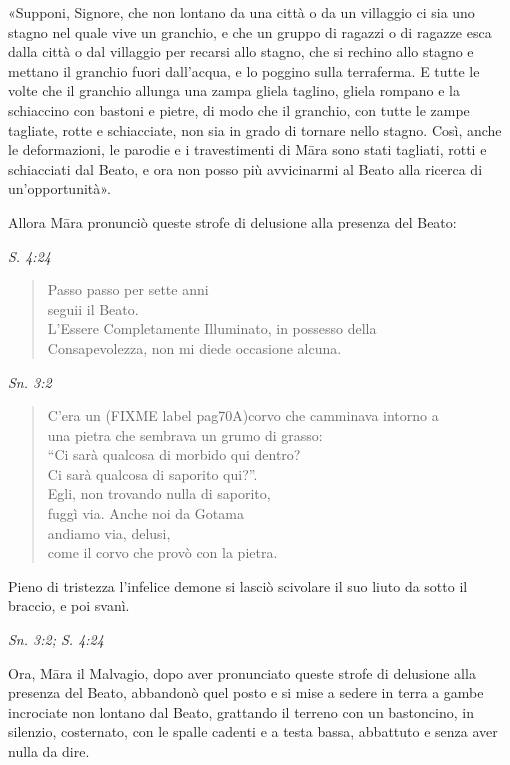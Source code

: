 «Supponi, Signore, che non lontano da una città o da un villaggio ci sia
uno stagno nel quale vive un granchio, e che un gruppo di ragazzi o di
ragazze esca dalla città o dal villaggio per recarsi allo stagno, che si
rechino allo stagno e mettano il granchio fuori dall’acqua, e lo poggino
sulla terraferma. E tutte le volte che il granchio allunga una zampa
gliela taglino, gliela rompano e la schiaccino con bastoni e pietre, di
modo che il granchio, con tutte le zampe tagliate, rotte e schiacciate,
non sia in grado di tornare nello stagno. Così, anche le deformazioni,
le parodie e i travestimenti di Māra sono stati tagliati, rotti e
schiacciati dal Beato, e ora non posso più avvicinarmi al Beato alla
ricerca di un’opportunità».


Allora Māra pronunciò queste strofe di delusione alla presenza del
Beato:


\emph{S. 4:24}


\begin{quotation}
Passo passo per sette anni \\
seguii il Beato. \\
L’Essere Completamente Illuminato, in possesso della \\
Consapevolezza, non mi diede occasione alcuna.
\end{quotation}

\emph{Sn. 3:2}


\begin{quotation}
C’era un (FIXME label pag70A)corvo che camminava intorno a \\
una pietra che sembrava un grumo di grasso: \\
“Ci sarà qualcosa di morbido qui dentro? \\
Ci sarà qualcosa di saporito qui?”. \\
Egli, non trovando nulla di saporito, \\
fuggì via. Anche noi da Gotama \\
andiamo via, delusi, \\
come il corvo che provò con la pietra.
\end{quotation}

Pieno di tristezza l’infelice demone si lasciò scivolare il suo liuto da
sotto il braccio, e poi svanì.


\emph{Sn. 3:2; S. 4:24}


Ora, Māra il Malvagio, dopo aver pronunciato queste strofe di delusione
alla presenza del Beato, abbandonò quel posto e si mise a sedere in
terra a gambe incrociate non lontano dal Beato, grattando il terreno con
un bastoncino, in silenzio, costernato, con le spalle cadenti e a testa
bassa, abbattuto e senza aver nulla da dire.


